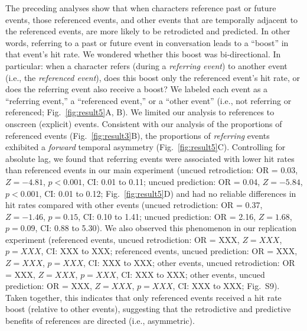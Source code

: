 \documentclass[10pt]{article}
\newcommand{\referringReferenced}{S9}
\begin{document}
The preceding analyses show that when characters reference past or future events, those referenced events, and other events that are temporally adjacent to the referenced events, are more likely to be retrodicted and predicted. In other words, referring to a past or future event in conversation leads to a ``boost'' in that event's hit rate. We wondered whether this boost was bi-directional. In particular: when a character refers (during a \textit{referring event}) to another event (i.e., the \textit{referenced event}), does this boost only the referenced event's hit rate, or does the referring event also receive a boost? We labeled each event as a ``referring event,'' a ``referenced event,'' or a ``other event'' (i.e., not referring or referenced; Fig.~\ref{fig:result5}A, B). We limited our analysis to references to onscreen (explicit) events. Consistent with our analysis of the proportions of referenced events (Fig.~\ref{fig:result3}B), the proportions of \textit{referring} events exhibited a \textit{forward} temporal asymmetry (Fig.~\ref{fig:result5}C). Controlling for absolute lag, we found that referring events were associated with lower hit rates than referenced events in our main experiment (uncued retrodiction: OR = 0.03, $Z = -4.81$, $p < 0.001$, CI: 0.01 to 0.11; uncued prediction: OR = 0.04, $Z = -5.84$, $p < 0.001$, CI: 0.01 to 0.12; Fig.~\ref{fig:result5}D) and had no reliable differences in hit rates compared with other events (uncued retrodiction: OR = 0.37, $Z = -1.46$, $p = 0.15$, CI: 0.10 to 1.41; uncued prediction: OR = 2.16, $Z = 1.68$, $p = 0.09$, CI: 0.88 to 5.30). We also observed this phenomenon in our replication experiment (referenced events, uncued retrodiction: OR = XXX, $Z = XXX$, $p = XXX$, CI: XXX to XXX; referenced events, uncued prediction: OR = XXX, $Z = XXX$, $p = XXX$, CI: XXX to XXX; other events, uncued retrodiction: OR = XXX, $Z = XXX$, $p = XXX$, CI: XXX to XXX; other events, uncued prediction: OR = XXX, $Z = XXX$, $p = XXX$, CI: XXX to XXX; Fig.~\referringReferenced). Taken together, this indicates that only referenced events received a hit rate boost (relative to other events), suggesting that the retrodictive and predictive benefits of references are directed (i.e., asymmetric).
\end{document}
